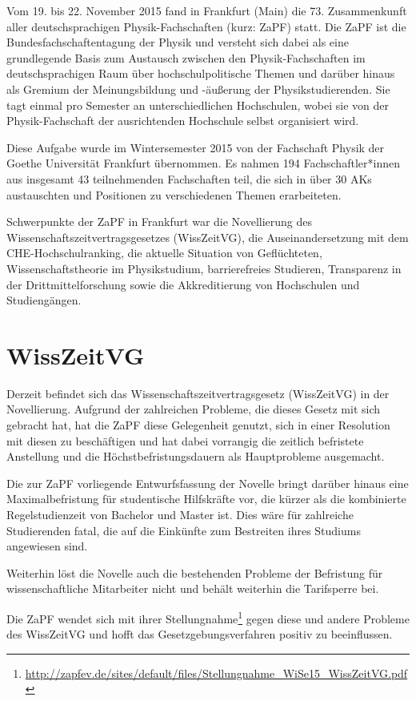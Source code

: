Vom 19. bis 22. November 2015 fand in Frankfurt (Main) die 73. Zusammenkunft
aller deutschsprachigen Physik-Fachschaften (kurz: ZaPF) statt.  Die ZaPF ist
die Bundesfachschaftentagung der Physik und versteht sich dabei als eine
grundlegende Basis zum Austausch zwischen den Physik-Fachschaften im
deutschsprachigen Raum über hochschulpolitische Themen und darüber hinaus als
Gremium der Meinungsbildung und -äußerung der Physikstudierenden. Sie tagt
einmal pro Semester an unterschiedlichen Hochschulen, wobei sie von der
Physik-Fachschaft der ausrichtenden Hochschule selbst organisiert wird.

Diese Aufgabe wurde im Wintersemester 2015 von der Fachschaft Physik der Goethe
Universität Frankfurt übernommen. Es nahmen 194 Fachschaftler*innen aus
insgesamt 43 teilnehmenden Fachschaften teil, die sich in über 30 AKs
austauschten und Positionen zu verschiedenen Themen erarbeiteten.

Schwerpunkte der ZaPF in Frankfurt war die Novellierung des
Wissenschaftszeitvertragsgesetzes (WissZeitVG), die Auseinandersetzung mit dem
CHE-Hochschulranking, die aktuelle Situation von Geflüchteten,
Wissenschaftstheorie im Physikstudium, barrierefreies Studieren, Transparenz in
der Drittmittelforschung sowie die Akkreditierung von Hochschulen und
Studiengängen.

\newpage

\section*{WissZeitVG}
Derzeit befindet sich das Wissenschaftszeitvertragsgesetz (WissZeitVG) in der
Novellierung. Aufgrund der zahlreichen Probleme, die dieses Gesetz mit sich
gebracht hat, hat die ZaPF diese Gelegenheit genutzt, sich in einer Resolution
mit diesen zu beschäftigen und hat dabei  vorrangig die zeitlich befristete
Anstellung und die Höchstbefristungsdauern als Hauptprobleme ausgemacht.

Die zur ZaPF vorliegende Entwurfsfassung der Novelle bringt darüber hinaus eine
Maximalbefristung für studentische Hilfskräfte vor, die kürzer als die
kombinierte Regelstudienzeit von Bachelor und Master ist. Dies wäre für
zahlreiche Studierenden fatal, die auf die Einkünfte zum Bestreiten ihres
Studiums angewiesen sind.

Weiterhin löst die Novelle auch die bestehenden Probleme der Befristung für
wissenschaftliche Mitarbeiter nicht und behält weiterhin die Tarifsperre bei.

Die ZaPF wendet sich mit ihrer
Stellungnahme\footnote{\href{http://zapfev.de/sites/default/files/Stellungnahme\_WiSe15\_WissZeitVG.pdf}{\url{http://zapfev.de/sites/default/files/Stellungnahme\_WiSe15\_WissZeitVG.pdf}}}
gegen diese und andere Probleme des WissZeitVG und hofft das
Gesetzgebungsverfahren positiv zu beeinflussen.

